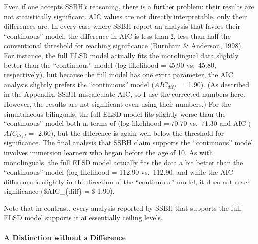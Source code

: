 \documentclass[
  english,
  doc,floatsintext]{apa6}
\let\oldparagraph\paragraph
\renewcommand{\paragraph}[1]{\oldparagraph{#1}\mbox{}}
\begin{document}
Even if one accepts SSBH's reasoning, there is a further problem: their results are not statistically significant. AIC values are not directly interpretable, only their differences are. In every case where SSBH report an analysis that favors their ``continuous'' model, the difference in AIC is less than 2, less than half the conventional threshold for reaching significance (Burnham \& Anderson, 1998). For instance, the full ELSD model actually fits the monolingual data slightly better than the ``continuous'' model (log-likelihood = 45.90 vs.~45.80, respectively), but because the full model has one extra parameter, the AIC analysis slightly prefers the ``continuous'' model (\(AIC_{diff} =\) 1.90). (As described in the Appendix, SSBH miscalculate AIC, so I use the corrected numbers here. However, the results are not significant even using their numbers.) For the simultaneous bilinguals, the full ELSD model fits slightly worse than the ``continuous'' model both in terms of (log-likelihood = 70.70 vs.~71.30 and AIC (\(AIC_{diff} =\) 2.60), but the difference is again well below the threshold for significance. The final analysis that SSBH claim supports the ``continuous'' model involves immersion learners who began before the age of 10. As with monolinguals, the full ELSD model actually fits the data a bit better than the ``continuous'' model (log-likelihood = 112.90 vs.~112.90, and while the AIC difference is slightly in the direction of the ``continuous'' model, it does not reach significance (\$AIC\_\{diff\} = \$ 1.90).

Note that in contrast, every analysis reported by SSBH that supports the full ELSD model supports it at essentially ceiling levels.

\hypertarget{a-distinction-without-a-difference}{%
\paragraph{A Distinction without a Difference}\label{a-distinction-without-a-difference}}
\end{document}
